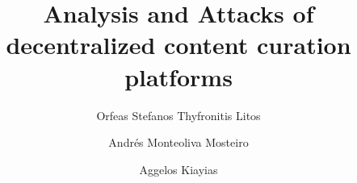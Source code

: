 \title{Analysis and Attacks of decentralized content curation platforms}
\author{Orfeas Stefanos Thyfronitis Litos \and Andr\'es Monteoliva Mosteiro \and
Aggelos Kiayias}
\maketitle
